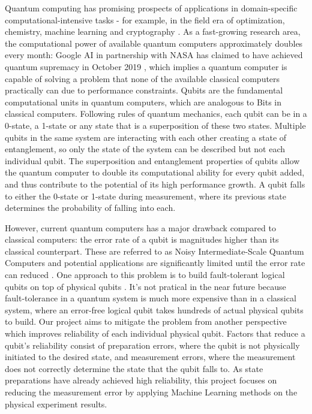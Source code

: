 \documentclass[letterpaper,twocolumn,10pt]{article}
\begin{document}
Quantum computing has promising prospects of applications in domain-specific computational-intensive tasks - for example, in the field era of optimization, chemistry, machine learning and cryptography \cite{quantum-application}. As a fast-growing research area, the computational power of available quantum computers approximately doubles every month: Google AI in partnership with NASA has claimed to have achieved quantum supremacy in October 2019 \cite{google-ai}, which implies a quantum computer is capable of solving a problem that none of the available classical computers practically can due to performance constraints. Qubits are the fundamental computational units in quantum computers, which are analogous to Bits in classical computers. Following rules of quantum mechanics, each qubit can be in a 0-state, a 1-state or any state that is a superposition of these two states. Multiple qubits in the same system are interacting with each other creating a state of entanglement, so only the state of the system can be described but not each individual qubit. The superposition and entanglement properties of qubits allow the quantum computer to double its computational ability for every qubit added, and thus contribute to the potential of its high performance growth. A qubit falls to either the 0-state or 1-state during measurement, where its previous state determines the probability of falling into each. 

However, current quantum computers has a major drawback compared to classical computers: the error rate of a qubit is magnitudes higher than its classical counterpart. These are referred to as Noisy Intermediate-Scale Quantum Computers and potential applications are significantly limited until the error rate can reduced \cite{quantum-application}. One approach to this problem is to build fault-tolerant logical qubits on top of physical qubits \cite{fault-tolerance}. It's not pratical in the near future because fault-tolerance in a quantum system is much more expensive than in a classical system, where an error-free logical qubit takes hundreds of actual physical qubits to build. Our project aims to mitigate the problem from another perspective which improves reliability of each individual physical qubit. Factors that reduce a qubit's reliability consist of preparation errors, where the qubit is not physically initiated to the desired state, and measurement errors, where the measurement does not correctly determine the state that the qubit falls to. As state preparations have already achieved high reliability, this project focuses on reducing the measurement error by applying Machine Learning methods on the physical experiment results.
\end{document}
